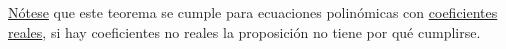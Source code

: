 \underline{Nótese} que este teorema se cumple para ecuaciones polinómicas con \underline{coeficientes reales}, si hay coeficientes no reales la proposición no tiene por qué cumplirse.

